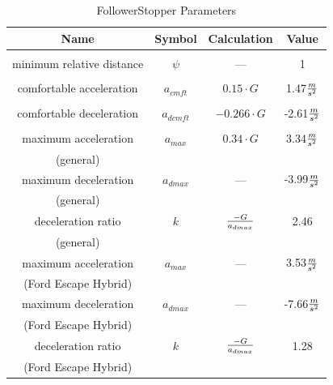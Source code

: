 \documentclass[conference]{IEEEtran}
\begin{document}
\begin{table}[htbp]
\caption{FollowerStopper Parameters}
\begin{center}
\begin{tabular}{|c|c|c|c|}
\hline
\textbf{Name} & \textbf{Symbol} & \textbf{Calculation} & \textbf{Value} \\
\hline
					&				&						&					\\
minimum relative distance	&	$\psi$		&	---					&	1				\\
					&				&						&					\\
comfortable acceleration	&	$a_{cmft}$	&	$0.15\cdot G$			&	1.47$m\over s^2$	\\
					&				&						&					\\
comfortable deceleration	&	$a_{dcmft}$	&	$-0.266\cdot G$		&	-2.61$m\over s^2$	\\
					&				&						&					\\
maximum acceleration	&	$a_{max}$	&	$0.34\cdot G$			&	3.34$m\over s^2$	\\
(general)				&				&						&					\\
maximum deceleration	&	$a_{dmax}$	&	---					&	-3.99$m\over s^2$	\\
(general)				&				&						&					\\
deceleration ratio		&	$k$			&	$-G\over a_{dmax}$		&	2.46				\\
(general)				&				&						&					\\
maximum acceleration	&	$a_{max}$	&	---					&	3.53$m\over s^2$	\\
(Ford Escape Hybrid)	&				&						&					\\
maximum deceleration	&	$a_{dmax}$	&	---					&	-7.66$m\over s^2$	\\
(Ford Escape Hybrid)	&				&						&					\\
deceleration ratio		&	$k$			&	$-G\over a_{dmax}$		&	1.28				\\
(Ford Escape Hybrid)	&				&						&					\\

\hline
\end{tabular}
\label{tab1}
\end{center}
\end{table}



\end{document}
